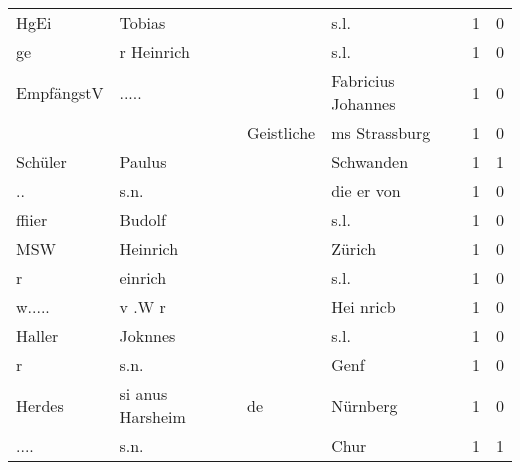 \begin{tabular}{llllrr}
                     HgEi &                             Tobias &             &                                        s.l. &          1 &         0 \\
                       ge &                         r Heinrich &             &                                        s.l. &          1 &         0 \\
               EmpfängstV &                              ..... &             &                          Fabricius Johannes &          1 &         0 \\
                          &                                    &  Geistliche &                               ms Strassburg &          1 &         0 \\
                  Schüler &                             Paulus &             &                                   Schwanden &          1 &         1 \\
                       .. &                               s.n. &             &                                  die er von &          1 &         0 \\
                   ffiier &                             Budolf &             &                                        s.l. &          1 &         0 \\
                      MSW &                           Heinrich &             &                                      Zürich &          1 &         0 \\
                        r &                            einrich &             &                                        s.l. &          1 &         0 \\
                   w..... &                             v .W r &             &                                   Hei nricb &          1 &         0 \\
                   Haller &                            Joknnes &             &                                        s.l. &          1 &         0 \\
                        r &                               s.n. &             &                                        Genf &          1 &         0 \\
                   Herdes &                   si anus Harsheim &          de &                                    Nürnberg &          1 &         0 \\
                     .... &                               s.n. &             &                                        Chur &          1 &         1 \\

\end{tabular}
